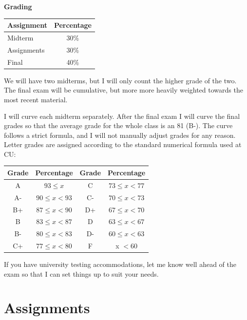 \documentclass[11pt]{article}
\begin{document}
\vspace{5mm}\noindent 
\textbf{Grading}
\begin{center}
	\small{
        \begin{tabular}{| l | c |}
            \hline
            \textbf{Assignment} & \textbf{Percentage}\\ 
			\hline
			Midterm & 30\% \\ \hline
			Assignments & 30\%  \\ \hline
			Final & 40\%  \\ \hline
		\end{tabular}}
\end{center}

We will have two midterms, but I will only count the higher grade of the two. The final exam will be cumulative, but more more heavily weighted towards the most recent material.

I will curve each midterm separately. After the final exam I will curve the final grades so that the average grade for the whole class is an 81 (B-). The curve follows a strict formula, and I will not manually adjust grades for any reason. Letter grades are assigned according to the standard numerical formula used at CU:

\begin{center}
	\footnotesize{
		\begin{tabular}{|c|c|c|c|}
			\hline
			\textbf{Grade} & \textbf{Percentage} & \textbf{Grade} & \textbf{Percentage}       \\ \hline
			A  & $93 \leq x$      & C  & $73 \leq x < 77$ \\ \hline
			A- & $90 \leq x < 93$ & C- & $70 \leq x < 73$ \\ \hline
			B+ & $87 \leq x < 90$ & D+ & $67 \leq x < 70$ \\ \hline
			B  & $83 \leq x < 87$ & D  & $63 \leq x < 67$ \\ \hline
			B- & $80 \leq x < 83$ & D- & $60 \leq x < 63$ \\ \hline
			C+ & $77 \leq x < 80$ & F  & x $< 60$         \\ \hline
		\end{tabular}}
\end{center}

If you have university testing accommodations, let me know well ahead of the exam so that I can set things up to suit your needs.


\section*{Assignments}
\end{document}
